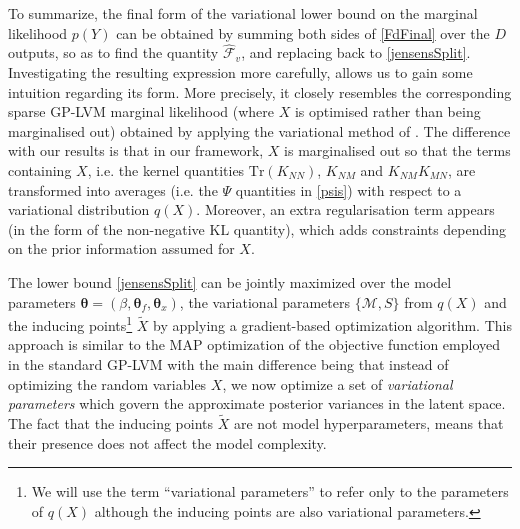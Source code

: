 \documentclass [10pt , a4paper]{article}
\begin{document}
\par To summarize, the final form of the variational lower bound on the marginal likelihood $p(Y)$ can be obtained by summing both sides
of \eqref{FdFinal} over the $D$ outputs, so as to find the quantity $\hat{\mathcal{F}}_v$, and replacing back to \eqref{jensensSplit}. Investigating the
 resulting expression more carefully, allows us to gain some intuition regarding its form. More precisely, it closely resembles the 
corresponding sparse GP-LVM marginal likelihood (where $X$ is optimised rather than being marginalised out) obtained by applying
 the variational method of \cite{Titsias:variational09}.
The difference with our results is that in our framework,
 $X$ is marginalised out so that the terms containing $X$, i.e. the kernel quantities
 $\text{Tr}(K_{NN})$, $K_{NM}$ and $K_{NM} K_{MN}$, are transformed into averages (i.e. the $\Psi$ quantities in \eqref{psis}) with
respect to a variational distribution $q(X)$. 
Moreover, an extra regularisation term appears (in the form of the non-negative $\text{KL}$ quantity), which adds constraints
depending on the prior information assumed for $X$.





\par The lower bound \eqref{jensensSplit} can be jointly maximized over the
model parameters $\boldsymbol \theta = (\beta, \boldsymbol \theta_f, \boldsymbol \theta_x)$, the variational
parameters $\{ \mathcal{M}, S \}$ from $q(X)$ and the inducing
points\footnote{We will use the term ``variational parameters'' to
  refer only to the parameters of $q(X)$ although the inducing points
  are also variational parameters.} $\tilde{X}$ by applying a gradient-based optimization algorithm. This approach is
similar to the MAP optimization of the objective function employed in the standard GP-LVM \cite{GPLVM} with the main
difference being that instead of optimizing the random variables $X$, we now optimize a set of \textit{variational
  parameters} which govern the approximate posterior variances in the latent space. The fact that the inducing points
$\tilde{X}$ are not model hyperparameters, means that their presence does not affect the model complexity.
\end{document}
